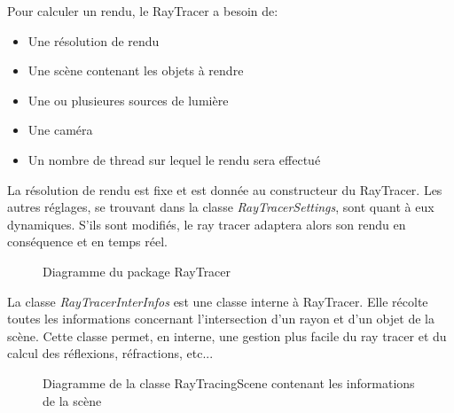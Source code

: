 \documentclass[../../Rapport RayTracer]{subfiles}
\begin{document}
Pour calculer un rendu, le RayTracer a besoin de:
\begin{itemize}
	\item{Une résolution de rendu}
	\item{Une scène contenant les objets à rendre}
	\item{Une ou plusieures sources de lumière}
	\item{Une caméra}
	\item{Un nombre de thread sur lequel le rendu sera effectué}
\end{itemize}
La résolution de rendu est fixe et est donnée au constructeur du RayTracer. Les autres réglages, se trouvant dans la classe \textit{RayTracerSettings}, sont quant à eux dynamiques. S'ils sont modifiés, le ray tracer adaptera alors son rendu en conséquence et en temps réel.

\begin{figure}[h!]
	
	\caption{Diagramme du package RayTracer}
	\label{diagrammeRayTracer}
\end{figure}
\FloatBarrier

La classe \textit{RayTracerInterInfos} est une classe interne à RayTracer. Elle récolte toutes les informations concernant l'intersection d'un rayon et d'un objet de la scène. Cette classe permet, en interne, une gestion plus facile du ray tracer et du calcul des réflexions, réfractions, etc...

\begin{figure}[h!]
	
	\caption{Diagramme de la classe RayTracingScene contenant les informations de la scène}
	\label{diagrammeRayTracingScene}
\end{figure}
\FloatBarrier
\end{document}
